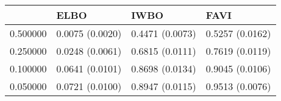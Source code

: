 \begin{tabular}{llll}
\toprule
 & ELBO & IWBO & FAVI \\
\midrule
0.500000 & 0.0075 (0.0020) & 0.4471 (0.0073) & 0.5257 (0.0162) \\
0.250000 & 0.0248 (0.0061) & 0.6815 (0.0111) & 0.7619 (0.0119) \\
0.100000 & 0.0641 (0.0101) & 0.8698 (0.0134) & 0.9045 (0.0106) \\
0.050000 & 0.0721 (0.0100) & 0.8947 (0.0115) & 0.9513 (0.0076) \\
\bottomrule
\end{tabular}
